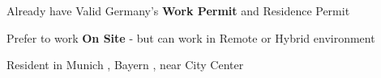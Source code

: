 
\begin{cvparagraph}
  \vspace{0.5em}
  \begin{cvitems}
    \item {Already have Valid Germany's \textbf{Work Permit} and {Residence Permit}}
    \item {Prefer to work \textbf{On Site} - but can work in Remote or Hybrid environment}
    \item {Resident in Munich , Bayern , near City Center}
  \end{cvitems}
\end{cvparagraph}
